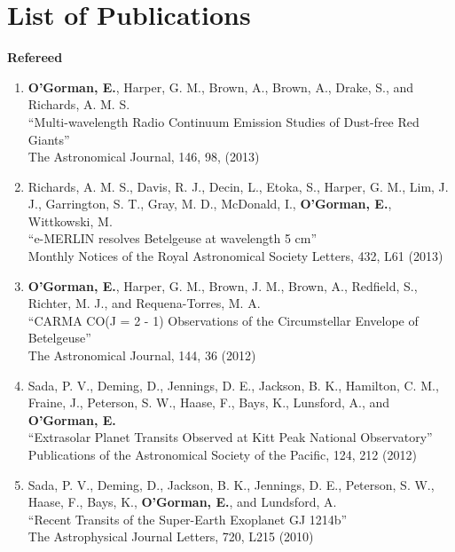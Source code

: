 \chapter{List of Publications}
\label{chapter:publications}


{\large \textbf{Refereed}}

\begin{enumerate}
\item \textbf{O'Gorman, E.}, Harper, G. M., Brown, A., Brown, A., Drake, S., and Richards, A. M. S.\\
``Multi-wavelength Radio Continuum Emission Studies of Dust-free Red Giants''\\
The Astronomical Journal, 146, 98, (2013)

\item Richards, A. M. S., Davis, R. J., Decin, L., Etoka, S., Harper, G. M., Lim, J. J., Garrington, S. T., Gray, M. D., McDonald, I., \textbf{O'Gorman, E.}, Wittkowski, M.\\
``e-MERLIN resolves Betelgeuse at wavelength 5 cm''\\
Monthly Notices of the Royal Astronomical Society Letters, 432, L61 (2013)

\item \textbf{O'Gorman, E.}, Harper, G. M., Brown, J. M., Brown, A., Redfield, S., Richter, M. J., and Requena-Torres, M. A.\\
``CARMA CO(J = 2 - 1) Observations of the Circumstellar Envelope of Betelgeuse''\\
The Astronomical Journal, 144, 36 (2012)

\item Sada, P. V., Deming, D., Jennings, D. E., Jackson, B. K., Hamilton, C. M., Fraine, J., Peterson, S. W., Haase, F., Bays, K., Lunsford, A., and \textbf{O'Gorman, E.}\\
``Extrasolar Planet Transits Observed at Kitt Peak National Observatory''\\
Publications of the Astronomical Society of the Pacific, 124, 212 (2012)

\item Sada, P. V., Deming, D., Jackson, B. K., Jennings, D. E., Peterson, S. W., Haase, F., Bays, K., \textbf{O'Gorman, E.}, and Lundsford, A.\\
``Recent Transits of the Super-Earth Exoplanet GJ 1214b''\\
The Astrophysical Journal Letters, 720, L215 (2010)
\end{enumerate}


